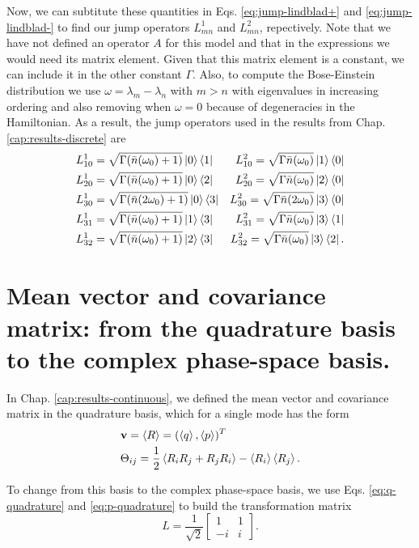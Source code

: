 \begin{apendicesenv}
Now, we can subtitute these quantities in Eqs. \eqref{eq:jump-lindblad+} and \eqref{eq:jump-lindblad-} to find our jump operators $L_{mn}^{1}$ and $L_{mn}^{2}$, repectively. Note that we have not defined an operator $A$ for this model and that in the expressions we would need its matrix element. Given that this matrix element is a constant, we can include it in the other constant $\Gamma$. Also, to compute the Bose-Einstein distribution we use $\omega = \lambda_m - \lambda_n$ with $m>n$ with eigenvalues in increasing ordering and also removing when $\omega = 0$ because of degeneracies in the Hamiltonian. As a result, the jump operators used in the results from Chap. \ref{cap:results-discrete} are
\begin{align}
	&L_{10}^{1} = \sqrt{\Gamma (\bar{n}(\omega_0)+1)} \ket{0}\bra{1} & L_{10}^{2} = \sqrt{\Gamma \bar{n}(\omega_0)} \ket{1}\bra{0}\\
	&L_{20}^{1} = \sqrt{\Gamma (\bar{n}(\omega_0)+1)} \ket{0}\bra{2} & L_{20}^{2} = \sqrt{\Gamma \bar{n}(\omega_0)} \ket{2}\bra{0}\\
	&L_{30}^{1} = \sqrt{\Gamma (\bar{n}(2\omega_0)+1)} \ket{0}\bra{3} & L_{30}^{2} = \sqrt{\Gamma \bar{n}(2\omega_0)} \ket{3}\bra{0}\\
	&L_{31}^{1} = \sqrt{\Gamma (\bar{n}(\omega_0)+1)} \ket{1}\bra{3} & L_{31}^{2} = \sqrt{\Gamma \bar{n}(\omega_0)} \ket{3}\bra{1}\\
	&L_{32}^{1} = \sqrt{\Gamma (\bar{n}(\omega_0)+1)} \ket{2}\bra{3} & L_{32}^{2} = \sqrt{\Gamma \bar{n}(\omega_0)} \ket{3}\bra{2}.
\end{align}



\chapter{Mean vector and covariance matrix: from the quadrature basis to the complex phase-space basis.}
\label{apx:change-basis}

In Chap. \ref{cap:results-continuous}, we defined the mean vector and covariance matrix in the quadrature basis, which for a single mode has the form
\begin{align}
    &\mathbf{v} = \braket{R} = (\braket{q}, \braket{p})^T\\
    &\Theta_{ij} = \frac{1}{2} \braket{R_i R_j + R_j R_i} - \braket{R_i} \braket{R_j}.
\end{align}

\noindent To change from this basis to the complex phase-space basis, we use Eqs. \eqref{eq:q-quadrature} and \eqref{eq:p-quadrature} to build the transformation matrix
\begin{equation}
    L = \frac{1}{\sqrt{2}} \begin{bmatrix}
        1& 1\\
        -i& i
    \end{bmatrix}.
\end{equation}


\end{apendicesenv}
